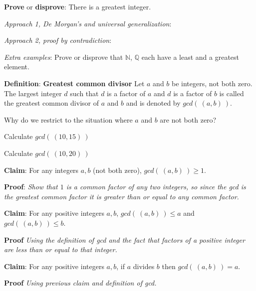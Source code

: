 \documentclass[12pt, oneside]{article}
\begin{document}
\vspace{100pt}

{\bf Prove} or {\bf  disprove}: There is a greatest integer. 

{\it Approach 1, De Morgan's and universal generalization}: 

\vspace{100pt}

{\it Approach 2, proof by contradiction}: 

\vspace{200pt}

{\it Extra examples}: 
Prove or disprove that $\mathbb{N}$,  $\mathbb{Q}$ each have a
least and a greatest element. 
 


{\bf Definition}: {\bf Greatest common divisor} Let $a$ and $b$ be integers, not both zero. The largest integer $d$ such that 
$d$ is a  factor of $a$ and $d$ is a factor of  $b$ is called the greatest common divisor of $a$ and $b$ 
and is denoted by $gcd(~(a, b)~)$. 

Why do we restrict to the situation where $a$ and $b$ are not both zero?

\vspace{50pt}


Calculate $gcd(~(10,15)~)$

\vspace{50pt}

Calculate $gcd(~(10,20)~)$

\vspace{50pt} 

{\bf Claim}: For any integers $a,b$ (not both zero), $gcd(~(a,b)~) \geq 1$.

{\bf Proof}: {\it Show that $1$ is a common factor of any two integers, so since the gcd 
is the greatest common factor it is greater than or equal to any common factor.}

\vspace{150pt}

{\bf Claim}: For any positive integers $a,b$, $gcd(~(a,b)~) \leq a$ and $gcd( ~(a,b)~) \leq b$.

{\bf Proof} {\it Using the definition of gcd and the fact that factors of a positive integer
are less than or equal to that integer.}

\vspace{150pt}

{\bf Claim}: For any positive integers $a,b$, if $a$ divides $b$ then $gcd(~(a,b)~) = a$.

{\bf Proof} {\it Using previous claim and definition of gcd.}
\end{document}
